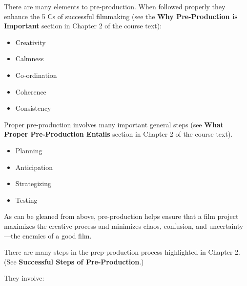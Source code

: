 \documentclass[
]{book}
\providecommand{\tightlist}{%
  \setlength{\itemsep}{0pt}\setlength{\parskip}{0pt}}
\begin{document}
There are many elements to pre-production. When followed properly they enhance the 5 Cs of successful filmmaking (see the \textbf{Why Pre-Production is Important} section in Chapter 2 of the course text):

\begin{itemize}
\tightlist
\item
  Creativity\\
\item
  Calmness\\
\item
  Co-ordination\\
\item
  Coherence\\
\item
  Consistency
\end{itemize}

Proper pre-production involves many important general steps (see \textbf{What Proper Pre-Production Entails} section in Chapter 2 of the course text).

\begin{itemize}
\tightlist
\item
  Planning\\
\item
  Anticipation\\
\item
  Strategizing\\
\item
  Testing
\end{itemize}

As can be gleaned from above, pre-production helps ensure that a film project maximizes the creative process and minimizes chaos, confusion, and uncertainty---the enemies of a good film.

There are many steps in the prep-production process highlighted in Chapter 2. (See \textbf{Successful Steps of Pre-Production}.)

They involve:
\end{document}
